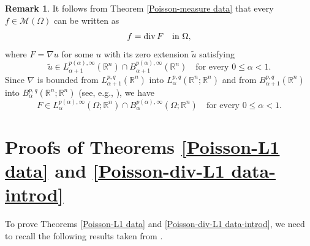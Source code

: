 \documentclass[reqno,centertags,11pt]{amsart}
\theoremstyle{definition}
\newtheorem{rmk}[thm]{Remark}
\numberwithin{thm}{section}
\numberwithin{equation}{section}
\newcommand{\R}{{\mathbb{R}}}
\begin{document}
\begin{rmk}\label{rep of measure as div}
It follows from Theorem  \ref{Poisson-measure data} that every $ f\in \mathcal{M}  (\Omega )$ can be written as
\[
f ={\rm div}\, F \quad\mbox{in}\,\, \Omega ,
\]
where $F =\nabla u$ for some $u$ with its zero extension $\widetilde{u}$ satisfying
\[
 \widetilde{u}   \in L_{\alpha+1}^{p(\alpha) ,\infty}(\R^n  )\cap B_{\alpha+1}^{p(\alpha) ,\infty}(\R^n  )\quad\mbox{for every}\,\, 0 \le \alpha < 1 .
\]
Since $\nabla$ is bounded from $L_{\alpha+1}^{p,q}(\R^n )$ into $L_{\alpha}^{p,q}(\R^n ;\R^n)$ and from $B_{\alpha+1}^{p,q}(\R^n )$ into $B_{\alpha}^{p,q}(\R^n ;\R^n )$  (see, e.g., \cite[(2.13) and (2.14)]{JK}), we have
\[
F  \in L_{\alpha}^{p(\alpha) ,\infty}(\Omega ;\R^n )\cap B_{\alpha}^{p(\alpha) ,\infty}(\Omega ;\R^n   )\quad\mbox{for every}\,\, 0 \le \alpha < 1 .
\]
\end{rmk}




\section{Proofs of Theorems \ref{Poisson-L1 data} and \ref{Poisson-div-L1 data-introd}}


To prove Theorems \ref{Poisson-L1 data} and \ref{Poisson-div-L1 data-introd}, we need to   recall the following results taken from \cite[Theorems 1.1 and 1.3]{KO}.
\end{document}
